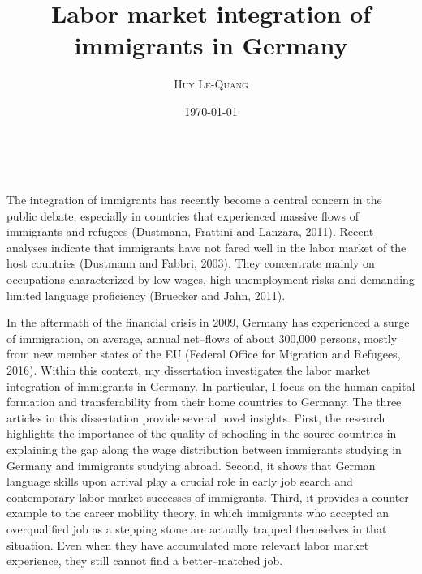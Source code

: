 \documentclass[a4paper, 10pt]{article} %
\title{\textbf{Labor market integration of immigrants in Germany}}
\author{\textsc{Huy Le-Quang}}%
\date{\today} %
\makeatletter
\renewcommand{\maketitle}{ %
\begin{center} %
{\LARGE\@title} %

\vspace{10pt} %

{\large\@author} %
\\\@date %

\vspace{10pt} %
\end{center}
}
\makeatother
\begin{document}
\maketitle %





The integration of immigrants has recently become a central concern in the public debate, especially in countries that experienced massive flows of immigrants and refugees (Dustmann, Frattini and Lanzara, 2011). Recent analyses indicate that immigrants have not fared well in the labor market of the host countries (Dustmann and Fabbri, 2003). They concentrate mainly on occupations characterized by low wages, high unemployment risks and demanding limited language proficiency (Bruecker and Jahn, 2011). 

In the aftermath of the financial crisis in 2009, Germany has experienced a surge of immigration, on average, annual net--flows of about 300,000 persons, mostly from new member states of the EU (Federal Office for Migration and Refugees, 2016). Within this context, my dissertation investigates the labor market integration of immigrants in Germany. In particular, I focus on the human capital formation and transferability from their home countries to Germany. The three articles in this dissertation provide several novel insights. First, the research highlights the importance of the quality of schooling in the source countries in explaining the gap along the wage distribution between immigrants studying in Germany and immigrants studying abroad. Second, it shows that German language skills upon arrival play a crucial role in early job search and contemporary labor market successes of immigrants. Third, it provides a counter example to the career mobility theory, in which immigrants who accepted an overqualified job as a stepping stone are actually trapped themselves in that situation. Even when they have accumulated more relevant labor market experience, they still cannot find a better--matched job.
\end{document}
